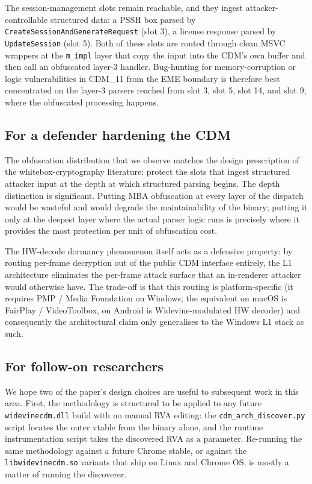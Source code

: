 \documentclass[11pt,letterpaper]{article}
\begin{document}
The session-management slots remain reachable, and they ingest
attacker-controllable structured data: a PSSH box parsed by
\texttt{CreateSessionAndGenerateRequest} (slot 3), a license
response parsed by \texttt{UpdateSession} (slot 5). Both of these
slots are routed through clean MSVC wrappers at the
\texttt{m\_impl} layer that copy the input into the CDM's own
buffer and then call an obfuscated layer-3 handler. Bug-hunting
for memory-corruption or logic vulnerabilities in CDM\_11 from
the EME boundary is therefore best concentrated on the layer-3
parsers reached from slot 3, slot 5, slot 14, and slot 9, where the
obfuscated processing happens.

\subsection{For a defender hardening the CDM}

The obfuscation distribution that we observe matches the design
prescription of the whitebox-cryptography literature: protect
the slots that ingest structured attacker input at the depth at
which structured parsing begins. The depth distinction is
significant. Putting MBA obfuscation at every layer of the dispatch
would be wasteful and would degrade the maintainability of the
binary; putting it only at the deepest layer where the actual
parser logic runs is precisely where it provides the most
protection per unit of obfuscation cost.

The HW-decode dormancy phenomenon itself acts as a defensive
property: by routing per-frame decryption out of the public CDM
interface entirely, the L1 architecture eliminates the per-frame
attack surface that an in-renderer attacker would otherwise have.
The trade-off is that this routing is platform-specific (it
requires PMP / Media Foundation on Windows; the equivalent on
macOS is FairPlay / VideoToolbox, on Android is Widevine-modulated
HW decoder) and consequently the architectural claim only
generalises to the Windows L1 stack as such.

\subsection{For follow-on researchers}

We hope two of the paper's design choices are useful to subsequent
work in this area. First, the methodology is structured to be
applied to any future \texttt{widevinecdm.dll} build with no manual
RVA editing: the \texttt{cdm\_arch\_discover.py} script locates the
outer vtable from the binary alone, and the runtime instrumentation
script takes the discovered RVA as a parameter. Re-running the same
methodology against a future Chrome stable, or against the
\texttt{libwidevinecdm.so} variants that ship on Linux and Chrome
OS, is mostly a matter of running the discoverer.
\end{document}
